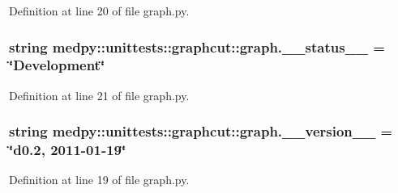 Definition at line 20 of file graph.py.

\hypertarget{namespacemedpy_1_1unittests_1_1graphcut_1_1graph_a0bcf2b9ec9cd32318d01b5e49534d466}{
\subsubsection[{\_\-\_\-status\_\-\_\-}]{\setlength{\rightskip}{0pt plus 5cm}string {\bf medpy::unittests::graphcut::graph.\_\-\_\-status\_\-\_\-} = \char`\"{}Development\char`\"{}}}
\label{namespacemedpy_1_1unittests_1_1graphcut_1_1graph_a0bcf2b9ec9cd32318d01b5e49534d466}


Definition at line 21 of file graph.py.

\hypertarget{namespacemedpy_1_1unittests_1_1graphcut_1_1graph_aa7e1e084ad063ebe80a5c37b9a61a1a6}{
\subsubsection[{\_\-\_\-version\_\-\_\-}]{\setlength{\rightskip}{0pt plus 5cm}string {\bf medpy::unittests::graphcut::graph.\_\-\_\-version\_\-\_\-} = \char`\"{}d0.2, 2011-\/01-\/19\char`\"{}}}
\label{namespacemedpy_1_1unittests_1_1graphcut_1_1graph_aa7e1e084ad063ebe80a5c37b9a61a1a6}


Definition at line 19 of file graph.py.

